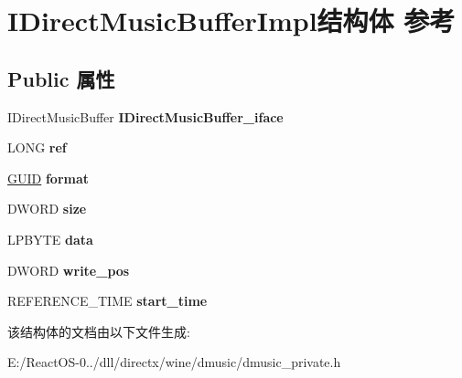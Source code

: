 \hypertarget{struct_i_direct_music_buffer_impl}{}\section{I\+Direct\+Music\+Buffer\+Impl结构体 参考}
\label{struct_i_direct_music_buffer_impl}
\subsection*{Public 属性}
\begin{DoxyCompactItemize}
\item 
\mbox{\label{struct_i_direct_music_buffer_impl_aa059c2dd43a8f6226a896489581d56b4}} 
I\+Direct\+Music\+Buffer {\bfseries I\+Direct\+Music\+Buffer\+\_\+iface}
\item 
\mbox{\label{struct_i_direct_music_buffer_impl_ab486cb0715bee23f4977e53db6f4333e}} 
L\+O\+NG {\bfseries ref}
\item 
\mbox{\label{struct_i_direct_music_buffer_impl_a8c76b9313d4e80f3ba1aed21583a338b}} 
\hyperlink{interface_g_u_i_d}{G\+U\+ID} {\bfseries format}
\item 
\mbox{\label{struct_i_direct_music_buffer_impl_a7d7752dad1a16cb2e4cd7487c97b05b4}} 
D\+W\+O\+RD {\bfseries size}
\item 
\mbox{\label{struct_i_direct_music_buffer_impl_a29424d91ee226dba634f7cd5a876e75f}} 
L\+P\+B\+Y\+TE {\bfseries data}
\item 
\mbox{\label{struct_i_direct_music_buffer_impl_a7308498e5e53ef370b756319d836129d}} 
D\+W\+O\+RD {\bfseries write\+\_\+pos}
\item 
\mbox{\label{struct_i_direct_music_buffer_impl_afcd6c63a16378afc63a3fd01bc1b51a9}} 
R\+E\+F\+E\+R\+E\+N\+C\+E\+\_\+\+T\+I\+ME {\bfseries start\+\_\+time}
\end{DoxyCompactItemize}


该结构体的文档由以下文件生成\+:\begin{DoxyCompactItemize}
\item 
E\+:/\+React\+O\+S-\/0../dll/directx/wine/dmusic/dmusic\+\_\+private.\+h\end{DoxyCompactItemize}
